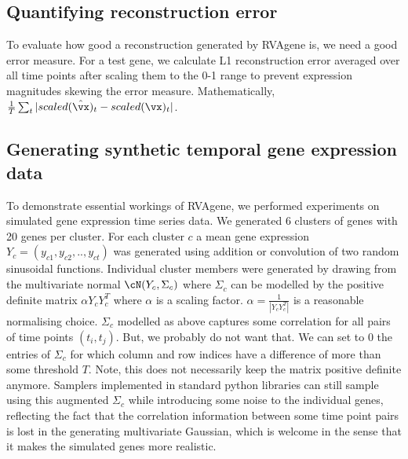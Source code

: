 \subsection{Quantifying reconstruction error}
To evaluate how good a reconstruction generated by RVAgene is, we need a good error measure. For a test gene, we calculate L1 reconstruction error averaged over all time points  after scaling them to the 0-1 range to prevent expression magnitudes skewing the error measure. Mathematically, $ \frac{1}{T}\sum_{t}|scaled(\hat{\vx})_t - scaled(\vx)_t| $.
\subsection{Generating synthetic temporal gene expression data} To demonstrate  essential workings of RVAgene, we performed experiments on simulated gene expression time series data. We generated 6 clusters of genes with 20 genes per cluster. For each cluster $c$ a mean gene expression $Y_c = (y_{c1},y_{c2},..,y_{ct})$ was generated using addition or convolution of two random sinusoidal functions. Individual cluster members were generated by drawing from the multivariate normal $\cN(Y_c,\Sigma_c)$ where $\Sigma_c$ can be modelled by the positive definite matrix $\alpha Y_cY_c^T$ where $\alpha$ is a scaling factor. $\alpha = \frac{1}{|Y_c Y_c^T|}$ is a reasonable normalising choice. $\Sigma_c$ modelled as above captures some correlation for all pairs of time points $(t_i,t_j)$. But, we probably do not want that. We can set to 0 the entries of $\Sigma_c$ for which column and row indices have a difference of more than some threshold $T$. Note, this does not necessarily keep the matrix positive definite anymore. Samplers implemented in standard python libraries can still sample using this augmented $\Sigma_c$ while introducing some noise to the individual genes, reflecting the fact that the correlation information between some time point pairs is lost in the generating multivariate Gaussian, which is welcome in the sense that it makes the simulated genes more realistic. 


